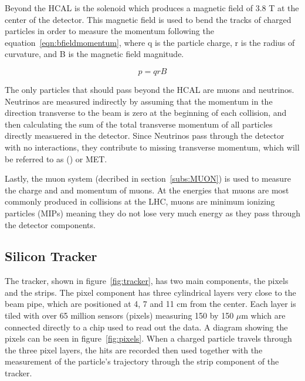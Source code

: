 Beyond the HCAL is the solenoid which produces a magnetic field of 3.8 T at the center of the detector.
This magnetic field is used to bend the tracks of charged particles in order to measure the momentum following the equation~\ref{eqn:bfieldmomentum},
where q is the particle charge, r is the radius of curvature, and B is the magnetic field magnitude.

\begin{equation}
  \label{eqn:bfieldmomentum}
p = qrB
\end{equation}

The only particles that should pass beyond the HCAL are muons and neutrinos.
Neutrinos are measured indirectly by assuming that the momentum in the direction transverse to the beam is zero at the beginning of each collision,
and then calculating the sum of the total transverse momentum of all particles directly measuered in the detector.
Since Neutrinos pass through the detector with no interactions, they contribute to missing transverse momentum, which will be referred to as (\MET) or MET.

Lastly, the muon system (decribed in section~\ref{subs:MUON}) is used to measure the charge and and momentum of muons.
At the energies that muons are most commonly produced in collisions at the LHC, muons are minimum ionizing particles (MIPs)
meaning they do not lose very much energy as they pass through the detector components.

\subsection{Silicon Tracker}
\label {subs:tracker}
The tracker, shown in figure~\ref{fig:tracker}, has two main components, the pixels and the strips.
The pixel component has three cylindrical layers very close to the beam pipe, which are positioned at 4, 7 and 11 cm from the center.
Each layer is tiled with over 65 million sensors (pixels) measuring 150 by 150 $\mu$m which are connected directly to a chip used to read out the data.
A diagram showing the pixels can be seen in figure~\ref{fig:pixels}.
When a charged particle travels through the three pixel layers,
the hits are recorded then used together with the measurement of the particle's trajectory through the strip component of the tracker.

